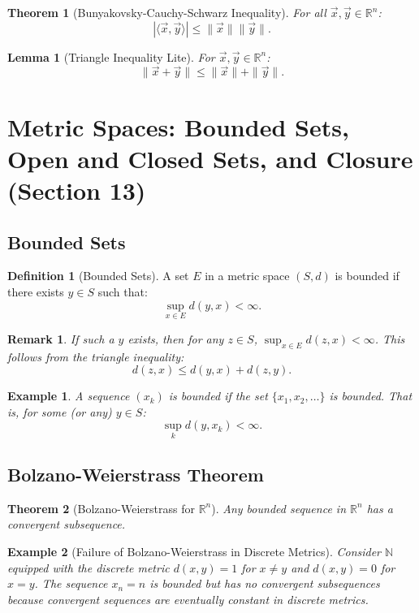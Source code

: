 \documentclass[9pt]{article}
\theoremstyle{definition}
\newtheorem{definition}{Definition}
\theoremstyle{plain}
\newtheorem{theorem}{Theorem}
\newtheorem{example}{Example}
\newtheorem{lemma}{Lemma}
\newtheorem{remark}{Remark}
\begin{document}
\begin{theorem}[Bunyakovsky-Cauchy-Schwarz Inequality]
For all \( \vec{x}, \vec{y} \in \mathbb{R}^n \):
\[
|\langle \vec{x}, \vec{y} \rangle| \leq \|\vec{x}\| \|\vec{y}\|.
\]
\end{theorem}

\begin{lemma}[Triangle Inequality Lite]
For \( \vec{x}, \vec{y} \in \mathbb{R}^n \):
\[
\|\vec{x} + \vec{y}\| \leq \|\vec{x}\| + \|\vec{y}\|.
\]
\end{lemma}
\section*{Metric Spaces: Bounded Sets, Open and Closed Sets, and Closure (Section 13)}

\subsection*{Bounded Sets}
\begin{definition}[Bounded Sets]
A set \( E \) in a metric space \( (S, d) \) is bounded if there exists \( y \in S \) such that:
\[
\sup_{x \in E} d(y, x) < \infty.
\]
\end{definition}

\begin{remark}
If such a \( y \) exists, then for any \( z \in S \), \( \sup_{x \in E} d(z, x) < \infty \). This follows from the triangle inequality:
\[
d(z, x) \leq d(y, x) + d(z, y).
\]
\end{remark}

\begin{example}
A sequence \( (x_k) \) is bounded if the set \( \{x_1, x_2, \ldots\} \) is bounded. That is, for some (or any) \( y \in S \):
\[
\sup_k d(y, x_k) < \infty.
\]
\end{example}

\subsection*{Bolzano-Weierstrass Theorem}
\begin{theorem}[Bolzano-Weierstrass for \( \mathbb{R}^n \)]
Any bounded sequence in \( \mathbb{R}^n \) has a convergent subsequence.
\end{theorem}

\begin{example}[Failure of Bolzano-Weierstrass in Discrete Metrics]
Consider \( \mathbb{N} \) equipped with the discrete metric \( d(x, y) = 1 \) for \( x \neq y \) and \( d(x, y) = 0 \) for \( x = y \). The sequence \( x_n = n \) is bounded but has no convergent subsequences because convergent sequences are eventually constant in discrete metrics.
\end{example}
\end{document}
